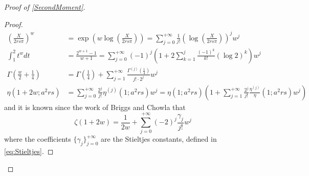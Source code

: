 \documentclass[10pt,a4paper]{amsart}
\theoremstyle{plain}
\theoremstyle{definition}
\theoremstyle{remark}
\begin{document}
\begin{proof}[Proof of \cref{SecondMoment}]
\begin{proof}
\[\begin{aligned}
            \left( \frac{X}{2 r s \pi} \right)^w &= \exp\left( w \log\left( \frac{X}{2 r s \pi} \right) \right) = \sum_{j=0}^{+\infty} \frac{1}{j!} \left( \log\left( \frac{X}{2 r s \pi} \right) \right)^j w^j \\
            \int_1^2 t^w dt &= \frac{2^{w+1}-1}{w+1} = \sum_{j=0}^{+\infty} (-1)^j \left( 1 + 2 \sum_{k=1}^j \frac{(-1)^k}{k!} (\log 2)^k \right) w^j \\
            \Gamma\left( \frac{w}{2} + \frac{1}{4} \right) &= \Gamma\left( \frac{1}{4}\right) + \sum_{j=1}^{+\infty} \frac{\Gamma^{(j)}\left( \frac{1}{4} \right)}{j! \cdot 2^j} w^j \\
            \eta(1+2w;a^2rs) &= \sum_{j=0}^{+\infty} \frac{2^j}{j!} \eta^{(j)}(1;a^2rs) w^j = \eta(1;a^2rs) \left(1 + \sum_{j=1}^{+\infty} \frac{2^j}{j!} \frac{\eta^{(j)}}{\eta}(1;a^2rs) w^j \right)
        \end{aligned}
    \]
    and it is known since the work of Briggs and Chowla \cite{Briggs_Chowla} that
    \[
        \zeta(1+2w) = \frac{1}{2 w} + \sum_{j=0}^{+\infty} (-2)^j \frac{\gamma_j}{j!} w^j
    \]
    where the coefficients $\{\gamma_j\}_{j=0}^{+\infty}$ are the Stieltjes constants, defined in \eqref{eq:Stieltjes}.


\end{proof}
\end{proof}
\end{document}

